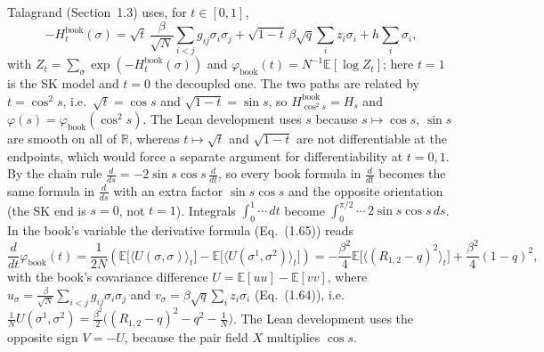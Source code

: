 \begin{remark}\label{rem:sg-tal:book-path}
Talagrand (Section~1.3) uses, for $t \in [0,1]$,
\[
-H_t^{\mathrm{book}}(\sigma)=\sqrt{t}\,\frac{\beta}{\sqrt{N}} \sum_{i<j} g_{ij}\sigma_i\sigma_j+\sqrt{1-t}\,\beta\sqrt{q}\sum_{i} z_i\sigma_i+h\sum_{i}\sigma_i ,
\]
with $Z_t=\sum_\sigma\exp(-H^{\mathrm{book}}_t(\sigma))$ and $\varphi_{\mathrm{book}}(t)=N^{-1}\mathbb{E}[\log Z_t]$; here $t=1$ is the SK model and $t=0$ the decoupled one. The two paths are related by $t=\cos^2 s$, i.e.\ $\sqrt t=\cos s$ and $\sqrt{1-t}=\sin s$, so $H^{\mathrm{book}}_{\cos^2 s}=H_s$ and $\varphi(s)=\varphi_{\mathrm{book}}(\cos^2 s)$. The Lean development uses $s$ because $s\mapsto\cos s$, $\sin s$ are smooth on all of $\mathbb R$, whereas $t\mapsto\sqrt t$ and $\sqrt{1-t}$ are not differentiable at the endpoints, which would force a separate argument for differentiability at $t=0,1$. By the chain rule $\frac{d}{ds}=-2\sin s\cos s\,\frac{d}{dt}$, so every book formula in $\frac{d}{dt}$ becomes the same formula in $\frac{d}{ds}$ with an extra factor $\sin s\cos s$ and the opposite orientation (the SK end is $s=0$, not $t=1$). Integrals $\int_0^1 \cdots\,dt$ become $\int_0^{\pi/2}\cdots\,2\sin s\cos s\,ds$.
In the book's variable the derivative formula (Eq.~(1.65)) reads
\[
\frac{d}{dt}\varphi_{\mathrm{book}}(t) = \frac{1}{2N} \left(\mathbb{E}\big[\langle U(\sigma, \sigma) \rangle_t\big] - \mathbb{E}\big[\langle U(\sigma^1, \sigma^2) \rangle_t\big]\right) = -\frac{\beta^2}{4} \mathbb{E}\big[\langle (R_{1,2} - q)^2 \rangle_t\big] + \frac{\beta^2}{4}(1 - q)^2 ,
\]
with the book's covariance difference $U=\mathbb{E}[uu]-\mathbb{E}[vv]$, where $u_\sigma=\frac{\beta}{\sqrt N}\sum_{i<j}g_{ij}\sigma_i\sigma_j$ and $v_\sigma=\beta\sqrt q\sum_iz_i\sigma_i$ (Eq.~(1.64)), i.e.\ $\frac1NU(\sigma^1,\sigma^2)=\frac{\beta^2}{2}\big((R_{1,2}-q)^2-q^2-\frac1N\big)$. The Lean development uses the opposite sign $V=-U$, because the pair field $X$ multiplies $\cos s$.
\end{remark}

